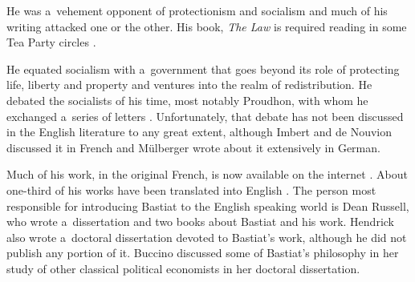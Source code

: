 He was a~vehement opponent of protectionism and socialism and much of his writing attacked one or the other. His book, \textit{The Law} 
\parencite*[][]{} %
 is required reading in some Tea Party circles 
\parencite[][]{zernike_shaping_2010}.%




He equated socialism with a~government that goes beyond its role of protecting life, liberty and property and ventures into the realm of redistribution. He debated the socialists of his time, most notably Proudhon, with whom he exchanged a~series of letters 
\parencite[][]{bastiat_sophismes_1873}. %
 Unfortunately, that debate has not been discussed in the English literature to any great extent, although Imbert 
\parencite*[][pp.57–66]{imbert_frederic_1913} %
 and de Nouvion 
\parencite*[][pp.256–269]{} %
 discussed it in French and Mülberger 
\parencite*[][]{} %
 wrote about it extensively in German.



Much of his work, in the original French, is now available on the internet 
\parencites[][]{bastiat_ce_1850}[][]{bastiat_essais_1861}[][]{bastiat_libre-echange_1862}[][]{bastiat_correspondance_1862}[][]{bastiat_cobden_1864}[][]{bastiat_harmonies_1870}[][]{bastiat_ce_1873}[][]{bastiat_sophismes_1873}. %
 About one-third of his works have been translated into English 
\parencites[][]{bastiat_bastiat_1926}[][]{bastiat_selected_1964}[][]{bastiat_economic_1964}[][]{bastiat_economic_1964-1}[][]{bastiat_providence_1991}[][]{bastiat_law_1998}[][]{bastiat_bastiat_2007}. %
 The person most responsible for introducing Bastiat to the English speaking world is Dean Russell, who wrote a~dissertation 
\parencite[][]{russell_frederic_1959} %
 and two books 
\parencites[][]{russell_frederic_1969}[][]{russell_government_1985} %
 about Bastiat and his work. Hendrick 
\parencite*[][]{hendrick_frederic_1987} %
 also wrote a~doctoral dissertation devoted to Bastiat's work, although he did not publish any portion of it. Buccino 
\parencite*[][]{buccino_examination_1990} %
 discussed some of Bastiat's philosophy in her study of other classical political economists in her doctoral dissertation.



